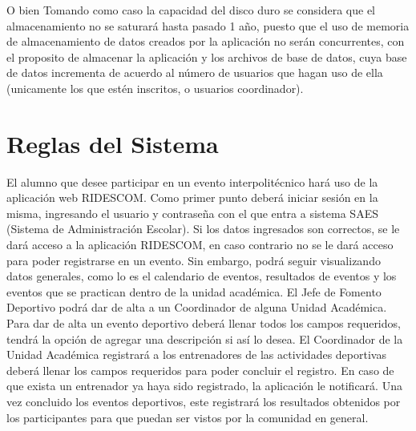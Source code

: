 \noindent O bien Tomando como caso la capacidad del disco duro se considera que el almacenamiento no se saturará hasta pasado 1 año, puesto que el uso de memoria de almacenamiento de datos creados por la aplicación no serán concurrentes, con el proposito de almacenar la aplicación y los archivos de base de datos, cuya base de datos incrementa de acuerdo al número de usuarios que hagan uso de ella (unicamente los que estén inscritos, o usuarios coordinador).\\


\section{Reglas del Sistema}
\noindent El alumno que desee participar en un evento interpolitécnico hará uso de la aplicación web RIDESCOM. Como primer punto deberá iniciar sesión en la misma, ingresando el usuario y contraseña con el que entra a sistema SAES (Sistema de Administración Escolar). Si los datos ingresados son correctos, se le dará acceso a la aplicación RIDESCOM, en caso contrario no se le dará acceso para poder registrarse en un evento. Sin embargo, podrá seguir visualizando datos generales, como lo es el calendario de eventos, resultados de eventos y los eventos que se practican dentro de la unidad académica.
El Jefe de Fomento Deportivo podrá dar de alta a un Coordinador de alguna Unidad Académica. Para dar de alta un evento deportivo deberá llenar todos los campos requeridos, tendrá la opción de agregar una descripción si así lo desea. 
El Coordinador de la Unidad Académica registrará a los entrenadores de las actividades deportivas deberá llenar los campos requeridos para poder concluir el registro. En caso de que exista un entrenador ya haya sido registrado, la aplicación le notificará. Una vez concluido los eventos deportivos, este registrará los resultados obtenidos por los participantes para que puedan ser vistos por la comunidad en general. 

